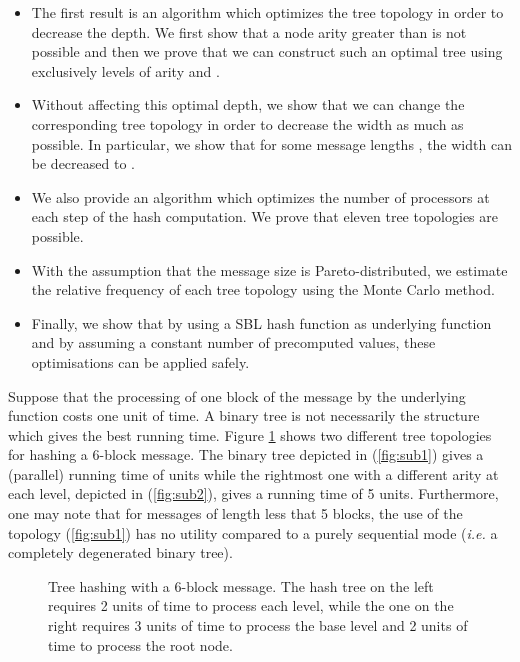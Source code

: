 \documentclass{llncs}
\begin{document}
\begin{itemize}
 \item The first result is an algorithm which optimizes 
the tree topology in order to decrease the depth. We first show that a node arity greater than  is not possible and then we prove
that we can construct such an optimal tree using exclusively levels of arity  and .
 \item Without affecting this optimal depth, 
we show that we can change the corresponding tree topology in order to decrease the width as much as possible. 
In particular, we show that for some message lengths , the width can be decreased to .
\item We also provide an algorithm which optimizes the number of processors 
 at each step of the hash computation. We prove that eleven tree topologies are possible.
 \item With the assumption that the message size is Pareto-distributed, we estimate the relative frequency of each tree topology 
 using the Monte Carlo method.
 \item Finally, we show that by using a SBL hash function as underlying function and by assuming a constant number of precomputed values, 
 these optimisations can be applied safely.
\end{itemize}



Suppose that the processing of one block of the message by the underlying function costs one unit of time. 
A binary tree is not necessarily the structure which gives the best running time. Figure \ref{Arbre_exemple} shows two different tree topologies for
hashing a 6-block message. 
The binary tree depicted in (\ref{fig:sub1}) gives a (parallel) running time of  units while the rightmost one with a different arity 
at each level, depicted in (\ref{fig:sub2}), gives a running time of 5 units. Furthermore, one may note that for messages of length less that 5 blocks, 
the use of the topology (\ref{fig:sub1}) has no utility compared to a purely sequential mode (\textit{i.e.} a completely degenerated binary tree).


\begin{figure}[h]
\centering
{}
\qquad\qquad
{}
\caption{Tree hashing with a 6-block message. The hash tree on the left requires 2 units of time to process each level, while the one on the right requires 
3 units of time to process the base level and 2 units of time to process the root node.}
\label{Arbre_exemple}
\end{figure}
\end{document}
